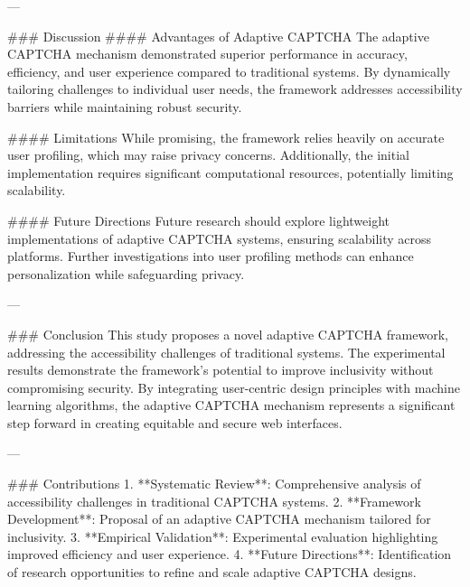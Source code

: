 ---

### Discussion
#### Advantages of Adaptive CAPTCHA
The adaptive CAPTCHA mechanism demonstrated superior performance in accuracy, efficiency, and user experience compared to traditional systems. By dynamically tailoring challenges to individual user needs, the framework addresses accessibility barriers while maintaining robust security.

#### Limitations
While promising, the framework relies heavily on accurate user profiling, which may raise privacy concerns. Additionally, the initial implementation requires significant computational resources, potentially limiting scalability.

#### Future Directions
Future research should explore lightweight implementations of adaptive CAPTCHA systems, ensuring scalability across platforms. Further investigations into user profiling methods can enhance personalization while safeguarding privacy.

---

### Conclusion
This study proposes a novel adaptive CAPTCHA framework, addressing the accessibility challenges of traditional systems. The experimental results demonstrate the framework's potential to improve inclusivity without compromising security. By integrating user-centric design principles with machine learning algorithms, the adaptive CAPTCHA mechanism represents a significant step forward in creating equitable and secure web interfaces.

---

### Contributions
1. **Systematic Review**: Comprehensive analysis of accessibility challenges in traditional CAPTCHA systems.
2. **Framework Development**: Proposal of an adaptive CAPTCHA mechanism tailored for inclusivity.
3. **Empirical Validation**: Experimental evaluation highlighting improved efficiency and user experience.
4. **Future Directions**: Identification of research opportunities to refine and scale adaptive CAPTCHA designs.